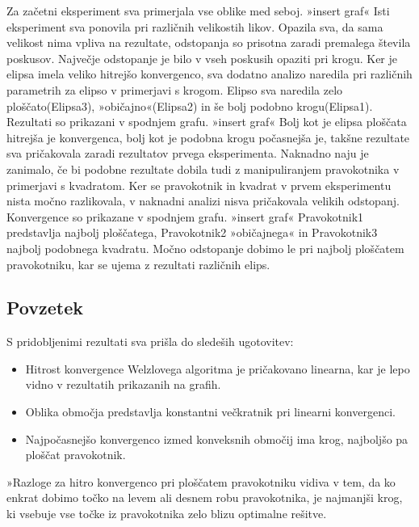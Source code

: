 \documentclass[a4paper]{article}
\begin{document}
Za začetni eksperiment sva primerjala vse oblike med seboj. 
»insert graf«
Isti eksperiment sva ponovila pri različnih velikostih likov. Opazila sva, da sama velikost nima vpliva na rezultate, odstopanja so prisotna zaradi premalega števila poskusov. 
Največje odstopanje je bilo v vseh poskusih opaziti pri krogu. Ker je elipsa imela veliko hitrejšo konvergenco, sva dodatno analizo naredila pri različnih parametrih za elipso v primerjavi s krogom. 
\newline Elipso sva naredila zelo ploščato(Elipsa3), »običajno«(Elipsa2) in še bolj podobno krogu(Elipsa1). Rezultati so prikazani v spodnjem grafu.
»insert graf«
Bolj kot je elipsa ploščata hitrejša je konvergenca, bolj kot je podobna krogu počasnejša je, takšne rezultate sva pričakovala zaradi rezultatov prvega eksperimenta.
Naknadno naju je zanimalo, če bi podobne rezultate dobila tudi z manipuliranjem pravokotnika v primerjavi s kvadratom. Ker se pravokotnik in kvadrat v prvem eksperimentu nista močno razlikovala, v naknadni analizi nisva pričakovala velikih odstopanj. Konvergence so prikazane v spodnjem grafu.
»insert graf«
Pravokotnik1 predstavlja najbolj ploščatega, Pravokotnik2 »običajnega« in Pravokotnik3 najbolj podobnega kvadratu.  Močno odstopanje dobimo le pri najbolj ploščatem pravokotniku, kar se ujema z rezultati različnih elips. 

\subsection{Povzetek }

S pridobljenimi rezultati sva prišla do sledeših ugotovitev:
\begin{itemize}
\item Hitrost konvergence Welzlovega algoritma je pričakovano linearna, kar je lepo vidno v rezultatih prikazanih na grafih.
\item Oblika območja predstavlja konstantni večkratnik pri linearni konvergenci.
\item Najpočasnejšo konvergenco izmed konveksnih območij ima krog, najboljšo pa ploščat pravokotnik. 

\end{itemize}

	»Razloge za hitro konvergenco pri ploščatem pravokotniku vidiva v tem, da ko enkrat dobimo točko na levem ali desnem robu pravokotnika, je najmanjši krog, ki vsebuje vse točke iz pravokotnika zelo blizu optimalne rešitve. 
\end{document}
